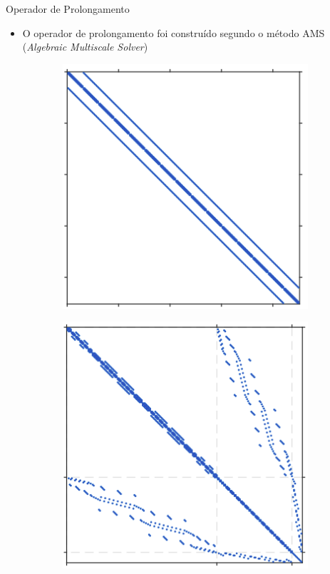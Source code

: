 \documentclass[professionalfont]{beamer}
\begin{document}
\begin{frame}{Operador de Prolongamento}
    \small
    \begin{itemize}
        \item O operador de prolongamento foi construído segundo o método AMS (\textit{Algebraic Multiscale Solver}) \cite{Wang2015,Moyner_2014}
    \end{itemize}

    \begin{figure}[!ht]
        
        \begin{subfigure}{.3\textwidth}
            \centering
            \includegraphics[scale=0.27]{./imgs/im10.png}
            \subcaption{$\fineTransmissibility$}
            \label{fig:multiescala.4.a}
        \end{subfigure}
        \begin{subfigure}{.3\textwidth}
            \centering
            \includegraphics[scale=0.27]{./imgs/im11.png}

\end{subfigure}
\end{figure}
\end{frame}
\end{document}
